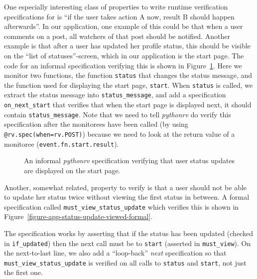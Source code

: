 One especially interesting class of properties to write runtime verification
specifications for is ``if the user takes action A now, result B should happen
afterwards''. In our application, one example of this could be that when a user
comments on a post, all watchers of that post should be notified. Another
example is that after a user has updated her profile status, this should
be visible on the ``list of statuses''-screen, which in our application is the
start page. The code for an informal specification verifying this is shown in
Figure~\ref{figure-app-status-update-displayed-informal}. Here we monitor two
functions, the function \texttt{status} that changes the status message, and
the function used for displaying the start page, \texttt{start}. When
\texttt{status} is called, we extract the status message into
\texttt{status\_message}, and add a specification \texttt{on\_next\_start} that
verifies that when the start page is displayed next, it should contain
\texttt{status\_message}. Note that we need to tell \textit{pythonrv} do verify
this specification after the monitorees have been called (by using
\texttt{@rv.spec(when=rv.POST)}) because we need to look at the return value of
a monitoree (\texttt{event.fn.start.result}).

\begin{figure}[h!]
	\begin{center}
	\begin{minipage}{0.9\textwidth}
	
	\end{minipage}
	\end{center}

  \caption{An informal \textit{pythonrv} specification verifying that user
    status updates are displayed on the start page.}
	\label{figure-app-status-update-displayed-informal}
\end{figure}

Another, somewhat related, property to verify is that a user should not be able
to update her status twice without viewing the first status in between. A formal
specification called \texttt{must\_view\_status\_update} which verifies this is
shown in Figure~\ref{figure-app-status-update-viewed-formal}.

The specification works by asserting that if the status has been updated
(checked in \texttt{if\_updated}) then the next call must be to \texttt{start}
(asserted in \texttt{must\_view}). On the next-to-last line, we also add a
``loop-back'' \textit{next} specification so that
\texttt{must\_view\_status\_update} is verified on all calls to \texttt{status}
and \texttt{start}, not just the first one.


